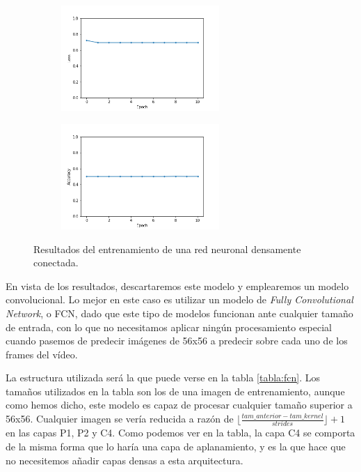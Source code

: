 \begin{figure}[h]
  \centering
  \begin{subfigure}[t]{0.4\linewidth}
    \centering
    \includegraphics[height=4cm]{images/dense_loss.png}
  \end{subfigure}
  \begin{subfigure}[t]{0.4\linewidth}
    \centering
    \includegraphics[height=4cm]{images/dense_acc.png}
  \end{subfigure}
  \caption{Resultados del entrenamiento de una red neuronal densamente conectada.}
  \label{fig:dense}
\end{figure}

En vista de los resultados, descartaremos este modelo y emplearemos un modelo convolucional. Lo mejor en este caso es utilizar un modelo de \textit{Fully Convolutional Network}, o FCN, dado que este tipo de modelos funcionan ante cualquier tamaño de entrada, con lo que no necesitamos aplicar ningún procesamiento especial cuando pasemos de predecir imágenes de 56x56 a predecir sobre cada uno de los frames del vídeo.

La estructura utilizada será la que puede verse en la tabla \ref{tabla:fcn}. Los tamaños utilizados en la tabla son los de una imagen de entrenamiento, aunque como hemos dicho, este modelo es capaz de procesar cualquier tamaño superior a 56x56. Cualquier imagen se vería reducida a razón de $\lfloor\frac{tam\_anterior - tam\_kernel}{strides}\rfloor+1$ en las capas P1, P2 y C4. Como podemos ver en la tabla, la capa C4 se comporta de la misma forma que lo haría una capa de aplanamiento, y es la que hace que no necesitemos añadir capas densas a esta arquitectura.

